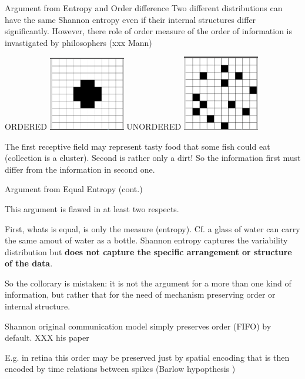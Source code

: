 \documentclass[10pt, aspectratio=169, handout]{beamer}
\begin{document}
\begin{frame}[label=equal_entropy]{Argument from Entropy and Order difference}
  Two different distributions can have the same Shannon entropy even if their internal structures differ significantly. However, there role of order measure of the order of information is invastigated by philosophers (xxx Mann)

\begin{center}
    ORDERED \includegraphics[width=0.25\textwidth]{images/entropia_1.png} UNORDERED \includegraphics[width=0.25\textwidth]{images/entropia_2.png}
\end{center}
   The first receptive field may represent tasty food that some  fish could eat (collection is a cluster). Second is rather only a dirt! So the information first must differ from the information in second one.
\end{frame}

\begin{frame}[label=equal_entropy_cont]{Argument from Equal Entropy (cont.)}    
       
This argument is flawed in at least two respects.

First, whats is equal, is only the measure (entropy). Cf. a glass of water can carry the same amout of water as a bottle.    Shannon entropy captures the variability distribution but \textbf{does not capture the specific arrangement or structure of the data}.


    So the collorary is mistaken: it is not the argument for a more than one kind of information, but rather that for the need of mechanism preserving order  or internal structure.

    Shannon original communication model simply preserves order (FIFO) by default. XXX his paper

    E.g. in retina this order may be preserved just by spatial encoding that is then encoded by time relations between spikes (Barlow hypopthesis )

   


\end{frame}
\end{document}
